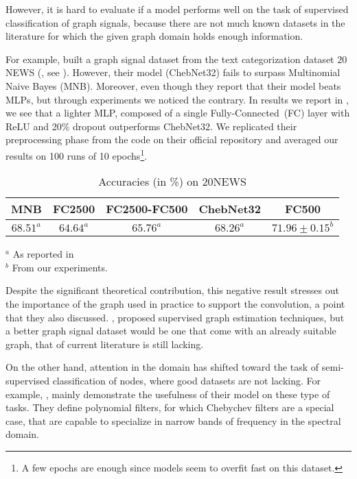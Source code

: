 However, it is hard to evaluate if a model performs well on the task of supervised classification of graph signals, because there are not much known datasets in the literature for which the given graph domain holds enough information.

For example, \citeauthor{defferrard2016convolutional} built a graph signal dataset from the text categorization dataset $20$NEWS (\cite{joachims1996probabilistic}, see ). However, their model (ChebNet32) fails to surpass Multinomial Naive Bayes (MNB). Moreover, even though they report that their model beats MLPs, but through experiments we noticed the contrary. In results we report in , we see that a lighter MLP, composed of a single Fully-Connected~(FC) layer with ReLU and 20\% dropout outperforms ChebNet32. We replicated their preprocessing phase from the code on their official repository and averaged our results on 100 runs of 10 epochs\footnote{A few epochs are enough since models seem to overfit fast on this dataset.}.

\begin{table}[H]
  \caption{Accuracies (in \%) on $20$NEWS}
  \begin{center}
    \bgroup
    \def\arraystretch{1.5}%
    \begin{tabular}{|c|c|c|c|c|}
      \hline
      MNB & FC2500 & FC2500-FC500 & ChebNet32 & FC500\\
      \hline
      $68.51^a$ & $64.64^a$ & $65.76^a$ & $68.26^a$ & $\mathbf{71.96} \pm 0.15^b$\\
      \hline
    \end{tabular}
    \egroup
  \end{center}
\begin{flushleft}
\footnotesize{
$^a$ As reported in \cite{defferrard2016convolutional}\\
$^b$ From our experiments.
}
\end{flushleft}
  \label{tab:20}
\end{table}

Despite the significant theoretical contribution, this negative result stresses out the importance of the graph used in practice to support the convolution, a point that they also discussed. \cite{henaff2015deep}, proposed supervised graph estimation techniques, but a better graph signal dataset would be one that come with an already suitable graph, that of current literature is still lacking.

On the other hand, attention in the domain has shifted toward the task of semi-supervised classification of nodes, where good datasets are not lacking. For example, \cite{levie2017cayleynets}, mainly demonstrate the usefulness of their model on these type of tasks. They define polynomial filters, for which Chebychev filters are a special case, that are capable to specialize in narrow bands of frequency in the spectral domain.

